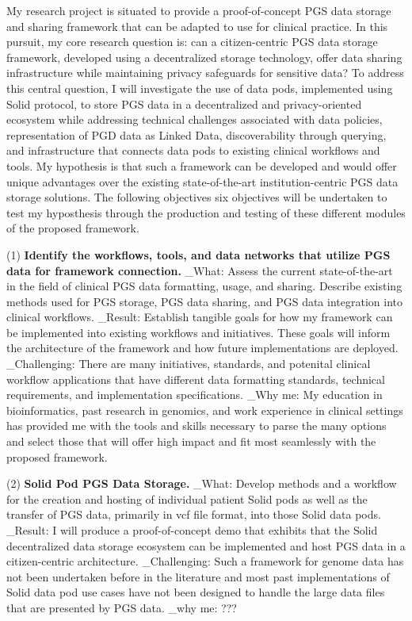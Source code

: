\documentclass[a4paper,11pt]{article}
\begin{document}
My research project is situated to provide a proof-of-concept PGS data storage and sharing framework that can be adapted to use for clinical practice. In this pursuit, my core research question is: can a citizen-centric PGS data storage framework, developed using a decentralized storage technology, offer data sharing infrastructure while maintaining privacy safeguards for sensitive data? 
To address this central question, I will investigate the use of data pods, implemented using Solid protocol, to store PGS data in a decentralized and privacy-oriented ecosystem while addressing technical challenges associated with data policies, representation of PGD data as Linked Data, discoverability through querying, and infrastructure that connects data pods to existing clinical workflows and tools. 
My hypothesis is that such a framework can be developed and would offer unique advantages over the existing state-of-the-art institution-centric PGS data storage solutions. 
The following objectives six objectives will be undertaken to test my hyposthesis through the production and testing of these different modules of the proposed framework.

(1) \textbf{Identify the workflows, tools, and data networks that utilize PGS data for framework connection.}
_What: Assess the current state-of-the-art in the field of clinical PGS data formatting, usage, and sharing. 
Describe existing methods used for PGS storage, PGS data sharing, and PGS data integration into clinical workflows.
_Result: Establish tangible goals for how my framework can be implemented into existing workflows and initiatives. These goals will inform the architecture of the framework and how future implementations are deployed. 
_Challenging: There are many initiatives, standards, and potenital clinical workflow applications that have different data formatting standards, technical requirements, and implementation specifications. 
_Why me: My education in bioinformatics, past research in genomics, and work experience in clinical settings has provided me with the tools and skills necessary to parse the many options and select those that will offer high impact and fit most seamlessly with the proposed framework.


(2) \textbf{Solid Pod PGS Data Storage.}
_What: Develop methods and a workflow for the creation and hosting of individual patient Solid pods as well as the transfer of PGS data, primarily in vcf file format, into those Solid data pods. 
_Result: I will produce a proof-of-concept demo that exhibits that the Solid decentralized data storage ecosystem can be implemented and host PGS data in a citizen-centric architecture.
_Challenging: Such a framework for genome data has not been undertaken before in the literature and most past implementations of Solid data pod use cases have not been designed to handle the large data files that are presented by PGS data. 
_why me: ???
\end{document}

